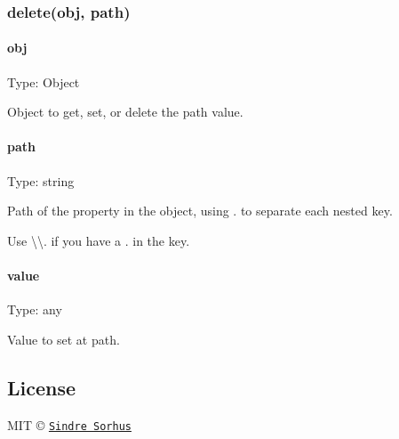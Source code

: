 \subsubsection*{delete(obj, path)}

\paragraph*{obj}

Type\+: {\ttfamily Object}

Object to get, set, or delete the {\ttfamily path} value.

\paragraph*{path}

Type\+: {\ttfamily string}

Path of the property in the object, using {\ttfamily .} to separate each nested key.

Use {\ttfamily \textbackslash{}\textbackslash{}.} if you have a {\ttfamily .} in the key.

\paragraph*{value}

Type\+: {\ttfamily any}

Value to set at {\ttfamily path}.

\subsection*{License}

M\+IT © \href{https://sindresorhus.com}{\tt Sindre Sorhus} 